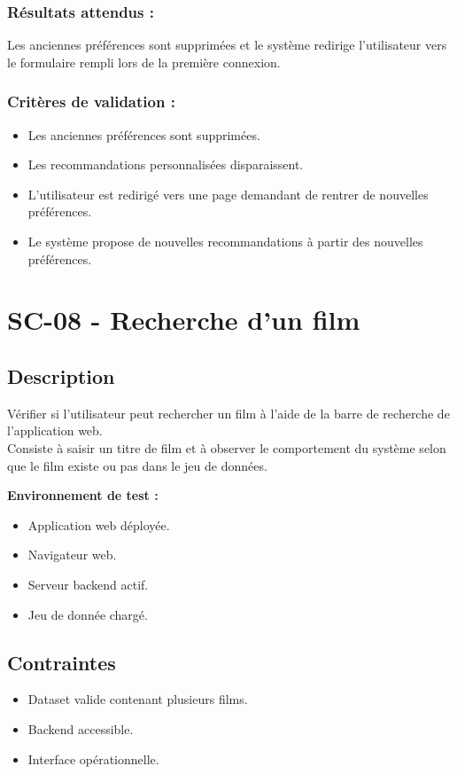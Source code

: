 \documentclass[a4paper,12pt]{report}
\begin{document}
\subsubsection{Résultats attendus :}
Les anciennes préférences sont supprimées et le système redirige l'utilisateur vers le formulaire rempli lors de la première connexion.
\subsubsection{Critères de validation :}
\begin{itemize}
    \item Les anciennes préférences sont supprimées.
    \item Les recommandations personnalisées disparaissent.
    \item L’utilisateur est redirigé vers une page demandant de rentrer de nouvelles préférences.
    \item Le système propose de nouvelles recommandations à partir des nouvelles préférences.
\end{itemize}
\newpage

\section{SC-08 - Recherche d’un film}
\label{Fi1}
\subsection*{Description}
Vérifier si l'utilisateur peut rechercher un film à l'aide de la barre de recherche de l'application web.\\
Consiste à saisir un titre de film et à observer le comportement du système selon que le film existe ou pas dans le jeu de données.

\textbf{Environnement de test :}
\begin{itemize}
    \item Application web déployée.
    \item Navigateur web.
    \item Serveur backend actif.
    \item Jeu de donnée chargé.
\end{itemize}
\subsection*{Contraintes}
\begin{itemize}
    \item Dataset valide contenant plusieurs films.
    \item Backend accessible.
    \item Interface opérationnelle.
\end{itemize}
\end{document}

